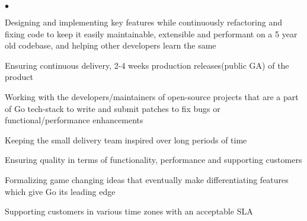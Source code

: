 \documentclass[margin,line]{res}
\newenvironment{list2}{
  \begin{list}{$\bullet$}{%
      \setlength{\itemsep}{0in}
      \setlength{\parsep}{0in} \setlength{\parskip}{0in}
      \setlength{\topsep}{0in} \setlength{\partopsep}{0in} 
      \setlength{\leftmargin}{0.2in}}}{\end{list}}
\begin{document}
\begin{resume}
\begin{list2}
\item Designing and implementing key features while continuously refactoring and fixing code to keep it easily maintainable, extensible and performant on a 5 year old codebase, and helping other developers learn the same
\item Ensuring continuous delivery, 2-4 weeks production releases(public GA) of the product
\item Working with the developers/maintainers of open-source projects that are a part of Go tech-stack to write and submit patches to fix bugs or functional/performance enhancements
\item Keeping the small delivery team inspired over long periods of time
\item Ensuring quality in terms of functionality, performance and supporting customers
\item Formalizing game changing ideas that eventually make differentiating features which give Go its leading edge
\item Supporting customers in various time zones with an acceptable SLA
\end{list2}


\end{resume}
\end{document}
